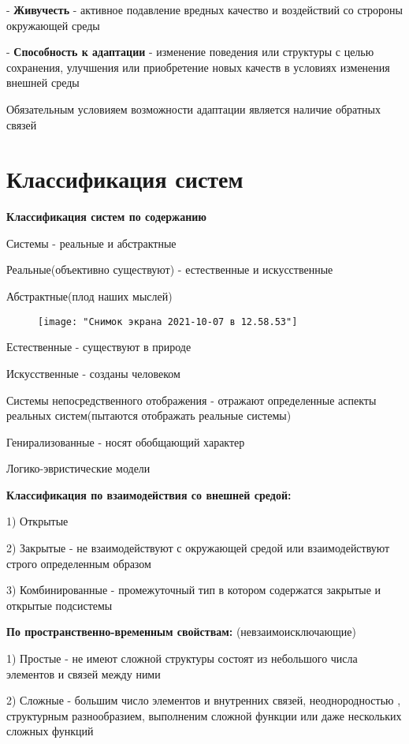 \documentclass[a4paper]{article}
\begin{document}
	- \textbf{Живучесть} - активное подавление вредных качество и воздействий со стророны окружающей среды
	
	- \textbf{Способность к адаптации} - изменение поведения или структуры с целью сохранения, улучшения или приобретение новых качеств в условиях изменения внешней среды
	
	Обязательным условияем возможности адаптации является наличие обратных связей
	
	\section{Классификация систем}
	
	\textbf{Классификация систем по содержанию }
	
	Системы - реальные и абстрактные
	
	Реальные(объективно существуют) - естественные и искусственные 
	
	Абстрактные(плод наших мыслей) 
	
	\begin{figure}[h]
		\centering
		\texttt{[image: "Снимок экрана 2021-10-07 в 12.58.53"]}
		\caption{}
		\label{fig:--2021-10-07--12}
	\end{figure}
	

	Естественные - существуют в природе
	
	Искусственные - созданы человеком
	
	Системы непосредственного отображения - отражают определенные аспекты реальных систем(пытаются отображать реальные системы)
	
	Генирализованные - носят обобщающий характер
	
	Логико-эвристические модели 
	
	\textbf{Классификация по взаимодействия со внешней средой:}
	
	1) Открытые
	
	2) Закрытые - не взаимодействуют с окружающей средой или взаимодействуют строго определенным образом
	
	3) Комбинированные - промежуточный тип в котором содержатся закрытые и открытые подсистемы
	
	\textbf{По пространственно-временным свойствам:} (невзаимоисключающие)
	
	1) Простые - не имеют сложной структуры состоят из небольшого числа элементов и связей между ними
	
	2) Сложные - большим число элементов и внутренних связей, неоднородностью , структурным разнообразием, выполненим сложной функции или даже нескольких сложных функций
	
\end{document}
